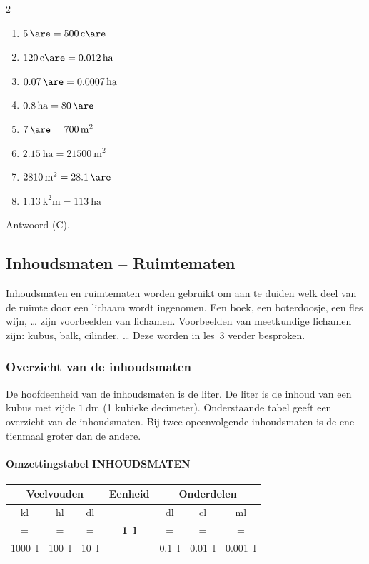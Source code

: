 \documentclass{bis}
\begin{document}
\begin{solution}
\begin{multicols}{2}
\begin{enumerate}
  \item \(\SI{5}{\are}=\SI{500}{\centi\are}\)
  \item \(\SI{120}{\centi\are}=\SI{0.012}{\hectare}\)
  \item \(\SI{0.07}{\are}=\SI{0.0007}{\hectare}\)
  \item \(\SI{0.8}{\hectare}=\SI{80}{\are}\)
  \item \(\SI{7}{\are}=\SI{700}{\square\metre}\)
  \item \(\SI{2.15}{\hectare}=\SI{21500}{\square\metre}\)
  \item \(\SI{2810}{\square\metre}=\SI{28.1}{\are}\)
  \item \(\SI{1.13}{\square\kilo\metre}=\SI{113}{\hectare}\)
\end{enumerate}
\end{multicols}
Antwoord (C).
\end{solution}

\subsection{Inhoudsmaten -- Ruimtematen}
Inhoudsmaten en ruimtematen worden gebruikt om aan te duiden welk deel van de ruimte door een lichaam wordt ingenomen. Een boek, een boterdoosje, een fles wijn, \dots{} zijn voorbeelden van lichamen. Voorbeelden van meetkundige lichamen zijn: kubus, balk, cilinder, \dots{} Deze worden in les~3 verder besproken.

\subsubsection{Overzicht van de inhoudsmaten}
De hoofdeenheid van de inhoudsmaten is de liter. De liter is de inhoud van een kubus met zijde \(\SI{1}{\deci\metre}\) (1 kubieke decimeter). Onderstaande tabel geeft een overzicht van de inhoudsmaten. Bij twee opeenvolgende inhoudsmaten is de ene tienmaal groter dan de andere.

\paragraph{Omzettingstabel INHOUDSMATEN}
\begin{center}
\renewcommand{\arraystretch}{1.2}\setlength{\tabcolsep}{4pt}%
\begin{tabular}{*{7}{c}}
  \multicolumn{3}{c}{\textbf{Veelvouden}} & \textbf{Eenheid} & \multicolumn{3}{c}{\textbf{Onderdelen}}\\
  \midrule
\si{\kilo\litre} & \si{\hecto\litre} & \si{\deca\litre} &  & \si{\deci\litre} & \si{\centi\litre} & \si{\milli\litre}\\
= & = & = & \textbf{\SI{1}{\litre}} & = & = & =\\
\SI{1000}{\litre} & \SI{100}{\litre} & \SI{10}{\litre} & & \SI{0.1}{\litre} & \SI{0.01}{\litre} & \SI{0.001}{\litre}
\end{tabular}
\end{center}
\end{document}
